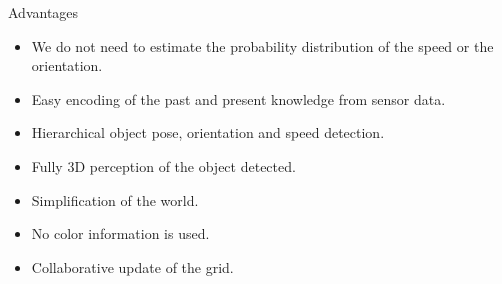 \begin{frame}{Advantages}
  \begin{itemize}
    \item We do not need to estimate the probability distribution of the speed or the orientation.
    \item Easy encoding of the past and present knowledge from sensor data.
    \item Hierarchical object pose, orientation and speed detection.
    \item Fully 3D perception of the object detected.
    \item Simplification of the world.
    \item No color information is used.
    \item Collaborative update of the grid.
  \end{itemize}


\end{frame}
